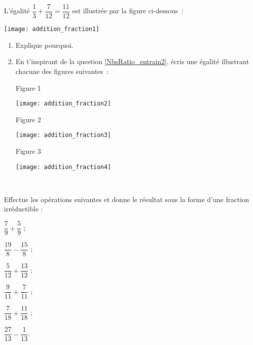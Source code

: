 \begin{exercice}
L'égalité $\dfrac{1}{3} + \dfrac{7}{12} = \dfrac{11}{12}$ est illustrée par la figure ci-dessous :
\begin{center} \texttt{[image: addition\_fraction1]} \end{center}
\begin{enumerate}
 \item Explique pourquoi. \label{NbsRatio_entrain2}
 \item En t'inspirant de la question \ref{NbsRatio_entrain2}, écris une égalité illustrant chacune des figures suivantes :
 
 \begin{minipage}[t]{0.28\linewidth}
 \begin{center} Figure 1 \end{center}
 \begin{center} \texttt{[image: addition\_fraction2]} \end{center}
  \end{minipage} \hfill%
 \begin{minipage}[t]{0.38\linewidth}
 \begin{center} Figure 2 \end{center}
 \begin{center} \texttt{[image: addition\_fraction3]} \end{center}
  \end{minipage} \hfill%
 \begin{minipage}[t]{0.3\linewidth}
 \begin{center} Figure 3 \end{center}
 \begin{center} \texttt{[image: addition\_fraction4]} \end{center}
  \end{minipage} \\
 \end{enumerate}
\end{exercice}


\begin{exercice}
Effectue les opérations suivantes et donne le résultat sous la forme d'une fraction irréductible : \\[0.1em]
\begin{colenumerate}{3}
 \item $\dfrac{7}{9} + \dfrac{5}{9}$ ;
 \vspace{0.2cm}
 \item $\dfrac{19}{8} - \dfrac{15}{8}$ ;
 \item $\dfrac{5}{12} + \dfrac{13}{12}$ ;
 \item $\dfrac{9}{11} + \dfrac{7}{11}$ ;
 \item $\dfrac{7}{18} + \dfrac{11}{18}$ ;
  \item $\dfrac{27}{13} - \dfrac{1}{13}$.
 \end{colenumerate}
\end{exercice}


